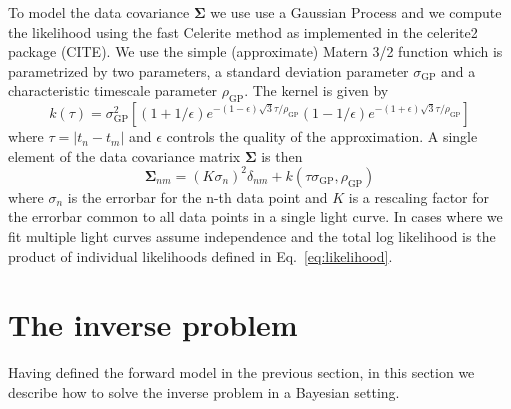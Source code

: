 \documentclass[modern]{aastex62}
\begin{document}
To model the data covariance $\boldsymbol{\Sigma}$ we use use a Gaussian Process and we compute the likelihood using the fast Celerite method \citep{foreman-mackey2017} as implemented in the \textsf{celerite2} package (CITE).
We use the simple (approximate) Matern 3/2 function which is parametrized by two parameters, a standard deviation parameter $\sigma_\mathrm{GP}$ and a characteristic timescale parameter $\rho_\mathrm{GP}$.
The kernel is given by 
\begin{equation}
    k(\tau)=\sigma_\mathrm{GP}^{2}\left[(1+1 / \epsilon) e^{-(1-\epsilon) \sqrt{3} \tau / \rho_\mathrm{GP}}(1-1 / \epsilon) e^{-(1+\epsilon) \sqrt{3} \tau / \rho_\mathrm{GP}}\right]
\end{equation}
where $\tau=|t_n-t_m|$ and $\epsilon$ controls the quality of the approximation.
A single element of the data covariance matrix $\boldsymbol{\Sigma}$ is then 
\begin{equation}
    \boldsymbol{\Sigma}_{nm}=(K\sigma_n)^2\delta_{nm} + k(\tau\sigma_\mathrm{GP},\rho_\mathrm{GP})
\end{equation}
where $\sigma_n$ is the errorbar for the n-th data point and $K$ is a rescaling factor for the errorbar common to all data points in a single light curve.
In cases where we fit multiple light curves assume independence and the total log likelihood is the product of individual likelihoods defined in Eq.~\ref{eq:likelihood}.

\section{The inverse problem}
\label{sec:inverse_problem}
Having defined the forward model in the previous section, in this section we describe how to solve the inverse problem in a Bayesian setting.
\end{document}
